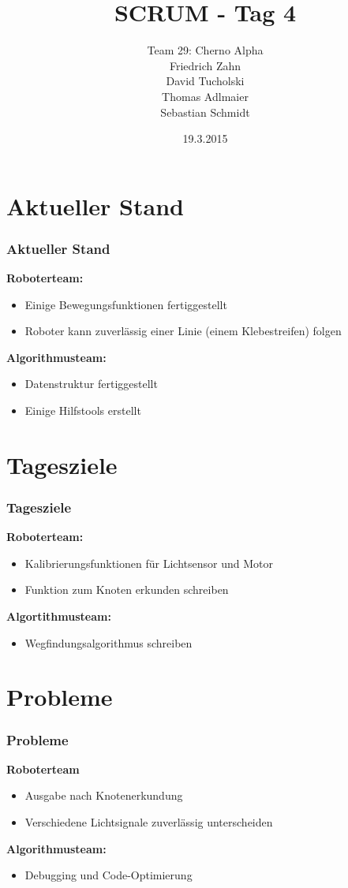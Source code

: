 \documentclass[ddcfooter,nototalpage]{tudbeamer}
\begin{document}
\title{SCRUM - Tag 4}
\author{Team 29: Cherno Alpha \\
Friedrich Zahn \\
David Tucholski \\
Thomas Adlmaier \\
Sebastian Schmidt
}
\date{19.3.2015}
\maketitle
\section{Aktueller Stand}
\begin{frame}
\frametitle{Aktueller Stand}
\normalsize

\textbf{Roboterteam:}
\begin{itemize}
\item Einige Bewegungsfunktionen fertiggestellt
\item Roboter kann zuverlässig einer Linie (einem Klebestreifen) folgen

\end{itemize}
\textbf{Algorithmusteam:}
\begin{itemize}
\item Datenstruktur fertiggestellt
\item Einige Hilfstools erstellt
\end{itemize}
\end{frame}
\section{Tagesziele}
\begin{frame}
\frametitle{Tagesziele}
\normalsize
\textbf{Roboterteam:}
\begin{itemize}

\item Kalibrierungsfunktionen für Lichtsensor und Motor
\item Funktion zum Knoten erkunden schreiben

\end{itemize}
\textbf{Algortithmusteam:}
\begin{itemize}
\item Wegfindungsalgorithmus schreiben
\end{itemize}
\end{frame}
\section{Probleme}
\begin{frame}
\frametitle{Probleme}
\normalsize
\textbf{Roboterteam}
\begin{itemize}
\item Ausgabe nach Knotenerkundung
\item Verschiedene Lichtsignale zuverlässig unterscheiden

\end{itemize}
\textbf{ }
\textbf{Algorithmusteam:}
\begin{itemize}
\item Debugging und Code-Optimierung
\end{itemize}
\end{frame}
\end{document}
